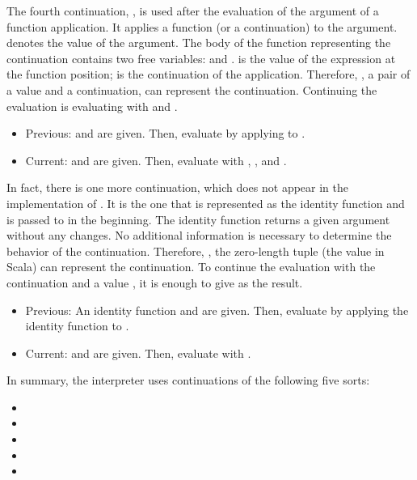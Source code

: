 The fourth continuation, , is used after the
evaluation of the argument of a function application. It applies a function (or
a continuation) to the argument.
 denotes the value of the argument. The body of the function
representing the continuation contains two free variables:  and
.
 is the value of the expression at the function position;
 is the continuation of the application. Therefore, ,
a pair of a value and a continuation, can represent
the continuation. Continuing the evaluation is evaluating 
with  and .

\begin{itemize}
  \item Previous:  and  are given. Then, evaluate
   by applying  to .
  \item Current:  and  are given. Then, evaluate  with , , and .
\end{itemize}

In fact, there is one more continuation, which does not appear in the implementation of
. It is the one that is represented as the identity function and is
passed to  in the beginning. The identity function returns a given
argument without any changes. No additional information is necessary to determine the
behavior of the continuation. Therefore, \code{()}, the zero-length tuple (the
 value in Scala) can represent the continuation. To continue the
evaluation with the continuation and a value , it is enough to give
 as the result.

\begin{itemize}
  \item Previous: An identity function and  are given. Then, evaluate 
  by applying the identity function to .
  \item Current: \code{()} and  are given. Then, evaluate  with
  .
\end{itemize}

In summary, the \lang interpreter uses continuations of the following five
sorts:

\begin{itemize}
  \item {}
  \item {}
  \item {}
  \item {}
  \item \code{()}
\end{itemize}

